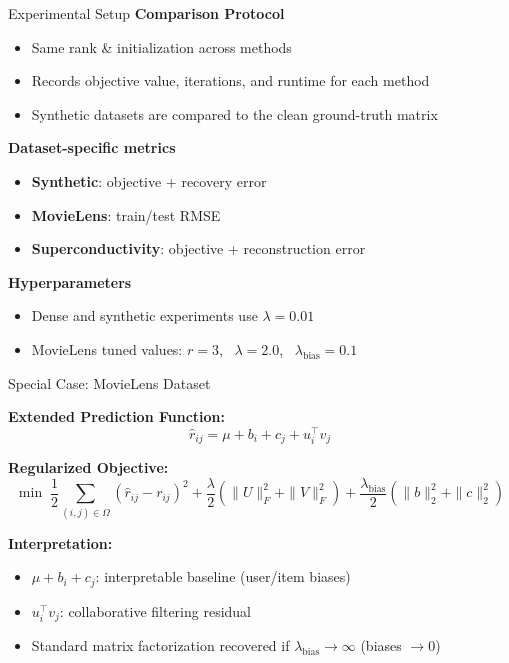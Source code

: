 \documentclass[aspectratio=169,usenames,dvipsnames]{beamer}
\begin{document}
\begin{frame}{Experimental Setup}
\textbf{Comparison Protocol}
\begin{itemize}
  \item Same rank \& initialization across methods \item Records objective value, iterations, and runtime for each method 
  \item Synthetic datasets are compared to the clean ground-truth matrix
\end{itemize}

\vspace{0.2cm}

\textbf{Dataset-specific metrics}
\begin{itemize}
    \item \textbf{Synthetic}: objective + recovery error
    \item \textbf{MovieLens}: train/test RMSE
    \item \textbf{Superconductivity}: objective + reconstruction error
\end{itemize}

\vspace{0.2cm}

\textbf{Hyperparameters}
\begin{itemize}
  \item Dense and synthetic experiments use $\lambda = 0.01$
  \item MovieLens tuned values: $r = 3$, \ $\lambda = 2.0$, \ $\lambda_{\text{bias}} = 0.1$
\end{itemize}
\end{frame}

\begin{frame}{Special Case: MovieLens Dataset}

\textbf{Extended Prediction Function:}
\[
\hat r_{ij} = \mu + b_i + c_j + u_i^\top v_j
\]

\textbf{Regularized Objective:}
\[
\min \; \frac{1}{2}\sum_{(i,j)\in\Omega}(\hat r_{ij}-r_{ij})^2
+ \frac{\lambda}{2}(\|U\|_F^2+\|V\|_F^2)
+ \frac{\lambda_{\text{bias}}}{2}(\|b\|_2^2+\|c\|_2^2)
\]

\textbf{Interpretation:}
\begin{itemize}
    \item $\mu + b_i + c_j$: interpretable baseline (user/item biases)
    \item $u_i^\top v_j$: collaborative filtering residual
    \item Standard matrix factorization recovered if $\lambda_{\text{bias}} \to \infty$ (biases $\to 0$)
\end{itemize}

\end{frame}
\end{document}
